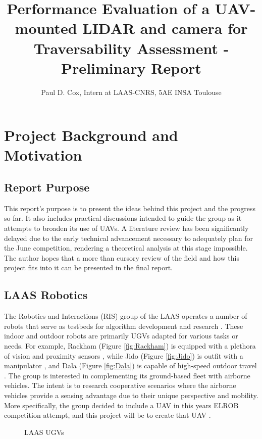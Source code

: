 \documentclass[a4paper,11pt]{report}
\title{Performance Evaluation of a UAV-mounted LIDAR and camera for Traversability Assessment - Preliminary Report}
\author{Paul D. Cox, Intern at LAAS-CNRS, 5AE INSA Toulouse}
\begin{document}
\maketitle

\tableofcontents
\newpage

\chapter{Project Background and Motivation}

\section{Report Purpose}

This report's purpose is to present the ideas behind this project and the progress so far. It also includes practical discussions intended to guide the group as it attempts to broaden its use of UAVs. A literature review has been significantly delayed due to the early technical advancement necessary to adequately plan for the June competition, rendering a theoretical analysis at this stage impossible. The author hopes that a more than cursory review of the field and how this project fits into it can be presented in the final report.

\section{LAAS Robotics}

The Robotics and Interactions (RIS) group of the LAAS operates a number of robots that serve as testbeds for algorithm development and research \cite{ugvs}. These indoor and outdoor robots are primarily UGVs adapted for various tasks or needs. For example, Rackham (Figure \ref{fig:Rackham}) is equipped with a plethora of vision and proximity sensors \cite{rackham}, while Jido (Figure \ref{fig:Jido}) is outfit with a manipulator \cite{jido}, and Dala (Figure \ref{fig:Dala}) is capable of high-speed outdoor travel \cite{dala}. The group is interested in complementing its ground-based fleet with airborne vehicles. The intent is to research cooperative scenarios where the airborne vehicles provide a sensing advantage due to their unique perspective and mobility. More specifically, the group decided to include a UAV in this years ELROB competition attempt, and this project will be to create that UAV \cite{this}. 

\begin{figure}[htb]
  \centering
  \caption{LAAS UGVs}
  \label{fig:ugvs}
\end{figure}
\end{document}
